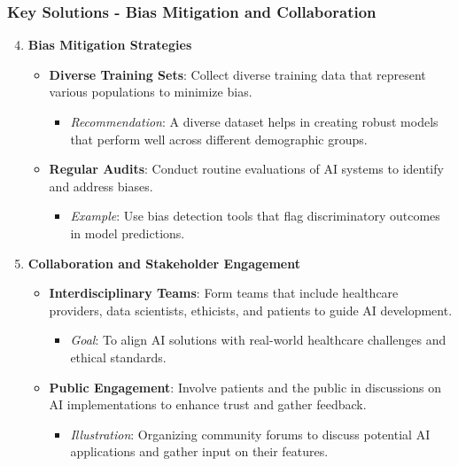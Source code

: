 \documentclass[aspectratio=169]{beamer}
\begin{document}
\begin{frame}[fragile]
    \frametitle{Key Solutions - Bias Mitigation and Collaboration}
    \begin{enumerate}
        \setcounter{enumi}{3}
        \item \textbf{Bias Mitigation Strategies}
            \begin{itemize}
                \item \textbf{Diverse Training Sets}: Collect diverse training data that represent various populations to minimize bias.
                \begin{itemize}
                    \item \textit{Recommendation}: A diverse dataset helps in creating robust models that perform well across different demographic groups.
                \end{itemize}
                \item \textbf{Regular Audits}: Conduct routine evaluations of AI systems to identify and address biases.
                \begin{itemize}
                    \item \textit{Example}: Use bias detection tools that flag discriminatory outcomes in model predictions.
                \end{itemize}
            \end{itemize}

        \item \textbf{Collaboration and Stakeholder Engagement}
            \begin{itemize}
                \item \textbf{Interdisciplinary Teams}: Form teams that include healthcare providers, data scientists, ethicists, and patients to guide AI development.
                \begin{itemize}
                    \item \textit{Goal}: To align AI solutions with real-world healthcare challenges and ethical standards.
                \end{itemize}
                \item \textbf{Public Engagement}: Involve patients and the public in discussions on AI implementations to enhance trust and gather feedback.
                \begin{itemize}
                    \item \textit{Illustration}: Organizing community forums to discuss potential AI applications and gather input on their features.
                \end{itemize}
            \end{itemize}
    \end{enumerate}
\end{frame}
\end{document}
